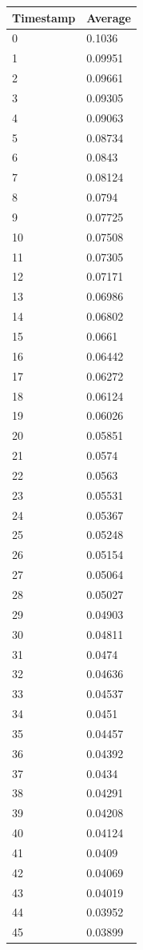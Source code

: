 %
%
\begin{tabular}{|l||l|}
\hline
	\textbf{Timestamp} & \textbf{Average} \\ \hline
	0 & 0.1036 \\ \hline
	1 & 0.09951 \\ \hline
	2 & 0.09661 \\ \hline
	3 & 0.09305 \\ \hline
	4 & 0.09063 \\ \hline
	5 & 0.08734 \\ \hline
	6 & 0.0843 \\ \hline
	7 & 0.08124 \\ \hline
	8 & 0.0794 \\ \hline
	9 & 0.07725 \\ \hline
	10 & 0.07508 \\ \hline
	11 & 0.07305 \\ \hline
	12 & 0.07171 \\ \hline
	13 & 0.06986 \\ \hline
	14 & 0.06802 \\ \hline
	15 & 0.0661 \\ \hline
	16 & 0.06442 \\ \hline
	17 & 0.06272 \\ \hline
	18 & 0.06124 \\ \hline
	19 & 0.06026 \\ \hline
	20 & 0.05851 \\ \hline
	21 & 0.0574 \\ \hline
	22 & 0.0563 \\ \hline
	23 & 0.05531 \\ \hline
	24 & 0.05367 \\ \hline
	25 & 0.05248 \\ \hline
	26 & 0.05154 \\ \hline
	27 & 0.05064 \\ \hline
	28 & 0.05027 \\ \hline
	29 & 0.04903 \\ \hline
	30 & 0.04811 \\ \hline
	31 & 0.0474 \\ \hline
	32 & 0.04636 \\ \hline
	33 & 0.04537 \\ \hline
	34 & 0.0451 \\ \hline
	35 & 0.04457 \\ \hline
	36 & 0.04392 \\ \hline
	37 & 0.0434 \\ \hline
	38 & 0.04291 \\ \hline
	39 & 0.04208 \\ \hline
	40 & 0.04124 \\ \hline
	41 & 0.0409 \\ \hline
	42 & 0.04069 \\ \hline
	43 & 0.04019 \\ \hline
	44 & 0.03952 \\ \hline
	45 & 0.03899 \\ \hline
\end{tabular}
